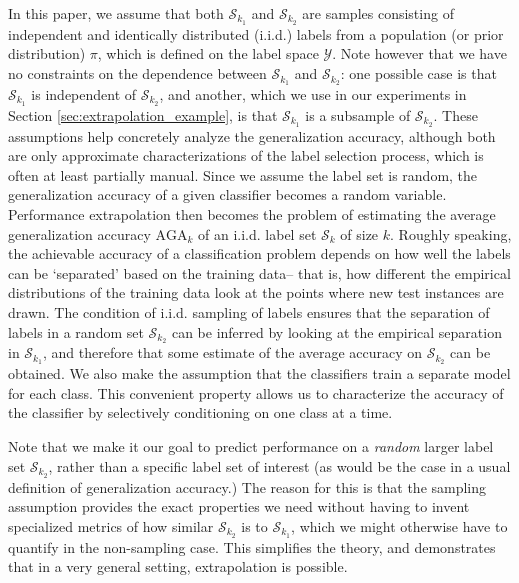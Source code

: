 \documentclass[twoside,11pt]{article}
\begin{document}
In this paper, we assume that both $\mathcal{S}_{k_1}$ and
$\mathcal{S}_{k_2}$ are samples consisting of independent and identically distributed (i.i.d.)
labels from a population (or prior distribution) $ \pi$, which is
defined on the label space $\mathcal{Y}$.  
Note however that we have no constraints on the dependence between $\mathcal{S}_{k_1}$ and
$\mathcal{S}_{k_2}$: one possible case is that $\mathcal{S}_{k_1}$ is independent of
$\mathcal{S}_{k_2}$, and another, which we use in our experiments in Section \ref{sec:extrapolation_example},
is that $\mathcal{S}_{k_1}$ is a subsample of $\mathcal{S}_{k_2}$.
These assumptions help
concretely analyze the generalization accuracy, although both are only
approximate characterizations of the label selection process, which is
often at least partially manual. Since we assume the label set is
random, the generalization accuracy of a given classifier becomes a
random variable.  Performance extrapolation then becomes the problem
of estimating the average generalization accuracy $\text{AGA}_k$ of an
i.i.d. label set $\mathcal{S}_k$ of size $k$.  
Roughly speaking, the achievable accuracy of a classification problem
depends on how well the labels can be `separated' based on the training data--
that is, how different the empirical distributions of the training data look
at the points where new test instances are drawn.  %
The condition of
i.i.d. sampling of labels ensures that the separation of labels in a
random set $\mathcal{S}_{k_2}$ can be inferred by looking at the
empirical separation in $\mathcal{S}_{k_1}$, and therefore that some
estimate of the average accuracy on $\mathcal{S}_{k_2}$ can be
obtained.  We also make the assumption that the classifiers train a
separate model for each class.  This convenient property allows us to
characterize the accuracy of the classifier by selectively
conditioning on one class at a time.

Note that we make it our goal to predict performance on a \emph{random} larger label set $\mathcal{S}_{k_2}$, rather than a specific label set of interest (as would be the case in a usual definition of generalization accuracy.)  The reason for this is that the sampling assumption provides the exact properties we need without having to invent specialized metrics of how similar $\mathcal{S}_{k_2}$ is to $\mathcal{S}_{k_1}$, which we might otherwise have to quantify in the non-sampling case.  This simplifies the theory, and demonstrates that in a very general setting, extrapolation is possible.
\end{document}

